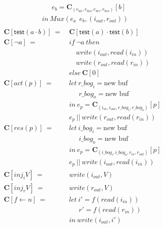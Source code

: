 \documentclass[12pt, letterpaper]{article}
\begin{document}
{\begin{align*}
             &\quad\ \ e_b = \mathbf{C}_{(e_{bii},e_{bio},e_{bri},e_{bro})}[b]\\
             &in\ Mux(e_a\ \ e_b, (i_{out},r_{out}))\\
    \end{align*}
    \begin{align*}
         \mathbf{C}[\mathsf{test}(a \cdot b)]\ 
            =\ &\mathbf{C}[\mathsf{test}(a) \cdot \mathsf{test}(b)] \\
         \mathbf{C}[\neg a]\ 
            =\ 
            &if\ \neg a\ then\\
            &\quad write(i_{out}, read(i_{in}))\\
            &\quad write(r_{out}, read(r_{in}))\\
            &else\ \mathbf{C}[0]\\
         \mathbf{C}[act(p)]\ 
             =\ &
             let\ r\_bog_i = \text{new buf}\\
             &\quad\ \ r\_bog_o = \text{new buf}\\
             &in\ e_p = \mathbf{C}_{(i_{in}, i_{out}, r\_bog_i, r\_bog_o)}[p]\\
             &e_p\ ||\ write(r_{out}, read(r_{in}))
             \\
         \mathbf{C}[res(p)]\ 
             =\ &
             let\ i\_bog_i = \text{new buf}\\
             &\quad\ \ i\_bog_o = \text{new buf}\\
             &in\ e_p = \mathbf{C}_{(i\_bog_i, i\_bog_o, r_{in}, r_{out})}[p]\\
             &e_p\ ||\ write(i_{out}, read(i_{in}))
             \\
         \mathbf{C}[inj_iV]\ 
             =\ &
             write(i_{out}, V)
             \\
         \mathbf{C}[inj_rV]\ 
             =\ &
             write(r_{out}, V)
             \\
         \mathbf{C}[f \leftarrow n]\ 
             =\ &
             let\ i' = f(read(i_{in}))\\
             &\quad\ \ r' = f(read(r_{in}))\\
             &in\ write(i_{out}, i')\\

\end{align*}}
\end{document}
